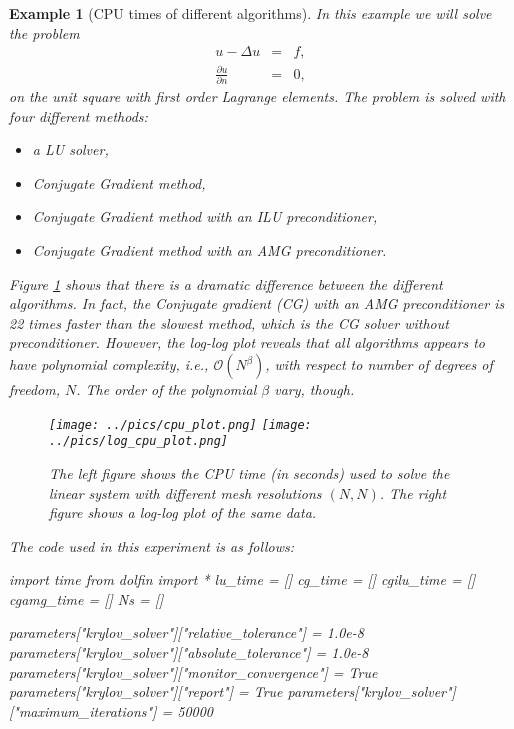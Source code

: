 \documentclass[a4paper,11pt]{amsart}
\newtheorem{example}{Example}[section]
\begin{document}
\begin{example}[CPU times of different algorithms] 
\label{ex1}
In this example we will solve the problem
\begin{eqnarray*}
u - \Delta u &=& f,  \\
\frac{\partial u}{\partial n} &=& 0,
\end{eqnarray*}
on the unit square with first order Lagrange elements.
The problem is solved with four different methods:
\begin{itemize}
\item a LU solver,
\item Conjugate Gradient method,
\item Conjugate Gradient method with an ILU preconditioner,
\item Conjugate Gradient method with an AMG preconditioner.
\end{itemize}

Figure \ref{fig:cpu} shows that there is a dramatic difference between the different algorithms.
In fact, the Conjugate gradient (CG) with an AMG preconditioner is 22 times faster than the
slowest method, which is the CG solver without preconditioner.
However, the log-log plot reveals that all algorithms appears to have polynomial complexity,
i.e., $\mathcal{O}(N^\beta)$, with respect to number of degrees of freedom, $N$. The order
of the polynomial $\beta$ vary, though.


\begin{figure}[h]
\begin{center}
\label{fig:cpu}
\texttt{[image: ../pics/cpu\_plot.png]}
\texttt{[image: ../pics/log\_cpu\_plot.png]}
\caption{The left figure shows the CPU time (in seconds) used to solve the linear system with
different mesh resolutions $(N,N)$. The right figure shows a log-log plot of the same data.}
\end{center}
\end{figure}


The code used in this experiment is as follows: 
\begin{python}
import time
from dolfin import *
lu_time = []
cg_time = []
cgilu_time = []
cgamg_time = []
Ns = []

parameters["krylov_solver"]["relative_tolerance"] = 1.0e-8
parameters["krylov_solver"]["absolute_tolerance"] = 1.0e-8
parameters["krylov_solver"]["monitor_convergence"] = True
parameters["krylov_solver"]["report"] = True
parameters["krylov_solver"]["maximum_iterations"] = 50000


\end{python}
\end{example}
\end{document}
